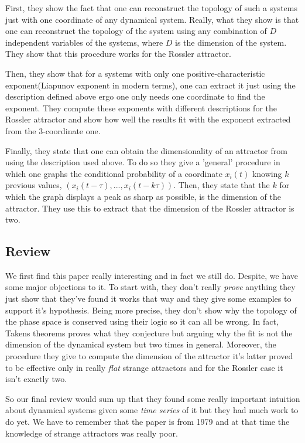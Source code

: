 \documentclass[10pt]{article}
\begin{document}
First, they show the fact that one can reconstruct the topology of such a systems just with one coordinate of any dynamical system. Really, what they show is that one can reconstruct the topology of the system using any combination of $D$ independent variables of the systems, where $D$ is the dimension of the system. They show that this procedure works for the Rossler attractor.

Then, they show that for a systems with only one positive-characteristic exponent(Liapunov exponent in modern terms), one can extract it just using the description defined above ergo one only needs one coordinate to find the exponent. They compute these exponents with different descriptions for the Rossler attractor and show how well the results fit with the exponent extracted from the 3-coordinate one.

Finally, they state that one can obtain the dimensionality of an attractor from using the description used above. To do so they give a 'general' procedure in which one graphs the conditional probability of a coordinate $x_i(t)$ knowing $k$ previous values, $(x_i(t-\tau), ..., x_i(t-k\tau))$. Then, they state that the $k$ for which the graph displays a peak as sharp as possible, is the dimension of the attractor. They use this to extract that the dimension of the Rossler attractor is two.

\subsection{Review}

We first find this paper really interesting and in fact we still do. Despite, we have some major objections to it. To start with, they don't really \textit{prove} anything they just show that they've found it works that way and they give some examples to support it's hypothesis. Being more precise, they don't show why the topology of the phase space is conserved using their logic so it can all be wrong. In fact, Takens theorems \cite{takens} proves what they conjecture but arguing why the fit is not the dimension of the dynamical system but two times in general. Moreover, the procedure they give to compute the dimension of the attractor it's latter proved to be effective only in really \textit{flat} strange attractors and for the Rossler case it isn't exactly two.

So our final review would sum up that they found some really important intuition about dynamical systems given some \textit{time series} of it but they had much work to do yet. We have to remember that the paper is from 1979 and at that time the knowledge of strange attractors was really poor.
\end{document}
